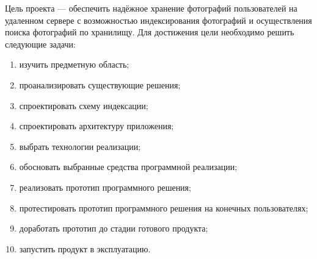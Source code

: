 Цель проекта — обеспечить надёжное хранение фотографий пользователей на удаленном сервере с возможностью индексирования фотографий и осуществления поиска фотографий по хранилищу. 
Для достижения цели необходимо решить следующие задачи:
\begin{enumerate}
    \item изучить предметную область;
    \item проанализировать существующие решения;
    \item спроектировать схему индексации;
    \item спроектировать архитектуру приложения;
    \item выбрать технологии реализации;
    \item обосновать выбранные средства программной реализации;
    \item реализовать прототип программного решения;
    \item протестировать прототип программного решения на конечных пользователях;
    \item доработать прототип до стадии готового продукта;
    \item запустить продукт в эксплуатацию.
\end{enumerate}

\clearpage